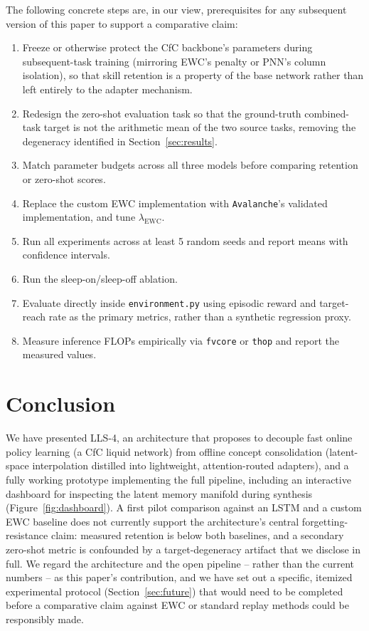 \documentclass[11pt]{article}
\begin{document}
The following concrete steps are, in our view, prerequisites for any subsequent version of this paper to support a comparative claim:
\begin{enumerate}
\item Freeze or otherwise protect the CfC backbone's parameters during subsequent-task training (mirroring EWC's penalty or PNN's column isolation), so that skill retention is a property of the base network rather than left entirely to the adapter mechanism.
\item Redesign the zero-shot evaluation task so that the ground-truth combined-task target is not the arithmetic mean of the two source tasks, removing the degeneracy identified in Section~\ref{sec:results}.
\item Match parameter budgets across all three models before comparing retention or zero-shot scores.
\item Replace the custom EWC implementation with \texttt{Avalanche}'s validated implementation, and tune $\lambda_{\text{EWC}}$.
\item Run all experiments across at least 5 random seeds and report means with confidence intervals.
\item Run the sleep-on/sleep-off ablation.
\item Evaluate directly inside \texttt{environment.py} using episodic reward and target-reach rate as the primary metrics, rather than a synthetic regression proxy.
\item Measure inference FLOPs empirically via \texttt{fvcore} or \texttt{thop} and report the measured values.
\end{enumerate}

\section{Conclusion}

We have presented LLS-4, an architecture that proposes to decouple fast online policy learning (a CfC liquid network) from offline concept consolidation (latent-space interpolation distilled into lightweight, attention-routed adapters), and a fully working prototype implementing the full pipeline, including an interactive dashboard for inspecting the latent memory manifold during synthesis (Figure~\ref{fig:dashboard}). A first pilot comparison against an LSTM and a custom EWC baseline does not currently support the architecture's central forgetting-resistance claim: measured retention is below both baselines, and a secondary zero-shot metric is confounded by a target-degeneracy artifact that we disclose in full. We regard the architecture and the open pipeline -- rather than the current numbers -- as this paper's contribution, and we have set out a specific, itemized experimental protocol (Section~\ref{sec:future}) that would need to be completed before a comparative claim against EWC or standard replay methods could be responsibly made.
\end{document}
